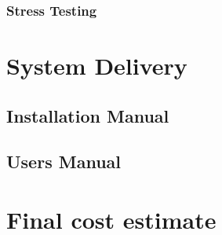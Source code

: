 \documentclass{article}
\begin{document}

\subsubsection{Stress Testing}


\section{System Delivery}


\subsection{Installation Manual}


\subsection{Users Manual}


\section{Final cost estimate}

\end{document}
